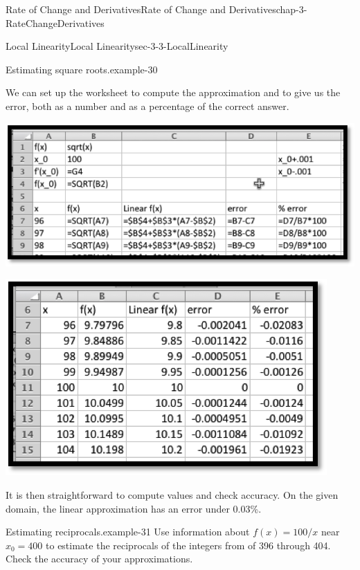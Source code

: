 \documentclass[oneside,10pt,]{book}
\numberwithin{equation}{section}
\begin{document}
\begin{chapterptx}{Rate of Change and Derivatives}{}{Rate of Change and Derivatives}{}{}{chap-3-RateChangeDerivatives}
\begin{sectionptx}{Local Linearity}{}{Local Linearity}{}{}{sec-3-3-LocalLinearity}
\begin{example}{Estimating square roots.}{example-30}
\begin{equation*}
\end{equation*}
%
\par
\hypertarget{p-1147}{}%
We can set up the worksheet to compute the approximation and to give us the error, both as a number and as a percentage of the correct answer.%
\begin{sidebyside}{1}{0.15}{0.15}{0}%
\begin{sbspanel}{0.7}%
\includegraphics[width=1\linewidth]{images/sec3-3-5.png}
\end{sbspanel}%
\end{sidebyside}%
\begin{sidebyside}{1}{0.2}{0.2}{0}%
\begin{sbspanel}{0.6}%
\includegraphics[width=1\linewidth]{images/sec3-3-6.png}
\end{sbspanel}%
\end{sidebyside}%
\par
\hypertarget{p-1148}{}%
It is then straightforward to compute values and check accuracy.  On the given domain, the linear approximation has an error under 0.03\%.%
\end{example}
\begin{example}{Estimating reciprocals.}{example-31}%
\hypertarget{p-1149}{}%
Use information about \(f(x)=100/x\) near \(x_0=400\) to estimate the reciprocals of the integers from of 396 through 404.  Check the accuracy of your approximations.%

\end{example}
\end{sectionptx}
\end{chapterptx}
\end{document}
